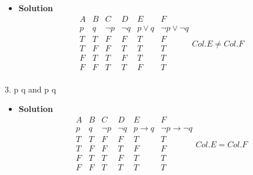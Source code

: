 \documentclass[11pt]{article}
\begin{document}
\begin{itemize}
\begin{itemize}
\item \textbf{Solution}\\

\begin{displaymath}
\begin{array}{|c|c|c|c|c|c|}
A & B & C & D & E & F\\
p & q & \neg  p & \neg q &  p \lor q &\neg p \lor \neg q\\ 
T & T & F & F & T & F \\
T & F & F & T & T & T\\
F & T & T & F & T & T\\
F & F & T & T & F & T\\
\end{array}
Col. E \neq Col. F
\end{displaymath}

\end{itemize}





\begin{flushleft}
{\large 3. p \rightarrow q \hspace{.2cm} and \hspace{.2cm} \neg p \rightarrow \neg q}\\
\end{flushleft}

\begin{itemize}

\item \textbf{Solution}\\

\begin{displaymath}
\begin{array}{|c|c|c|c|c|c|}
A & B & C & D & E & F\\
p & q & \neg  p & \neg q &  p \longrightarrow q &\neg p \longrightarrow \neg q\\ 
T & T & F & F & T & T \\
T & F & F & T & F & F\\
F & T & T & F & T & T\\
F & F & T & T & T & T\\
\end{array}
Col. E = Col. F
\end{displaymath}

\end{itemize}






\end{itemize}
\end{document}
